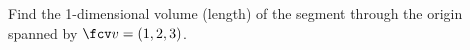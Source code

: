 \begin{frame}
\begin{example}
Find the 1-dimensional volume (length) of the segment through the origin spanned by $\fcv v=(1,2,3) $.
\end{example}
\end{frame}